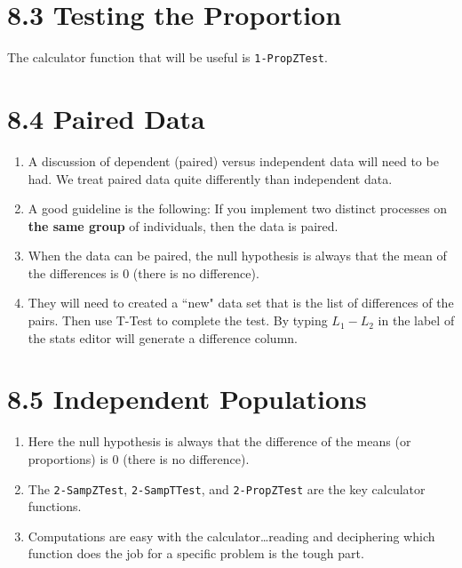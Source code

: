 \documentclass{article}
\begin{document}
\section*{8.3 Testing the Proportion}

The calculator function that will be useful is \texttt{1-PropZTest}.

\section*{8.4 Paired Data}

\begin{enumerate}

    \item A discussion of dependent (paired) versus independent data will need to be had.  We treat paired data quite differently than independent data.
    
    \item A good guideline is the following: If you implement two distinct processes on \textbf{the same group} of individuals, then the data is paired.
    
    \item When the data can be paired, the null hypothesis is always that the mean of the differences is 0 (there is no difference).
    
    \item They will need to created a ``new" data set that is the list of differences of the pairs. Then use T-Test to complete the test. By typing $L_1 - L_2$ in the label of the stats editor will generate a difference column.
    
\end{enumerate}

\section*{8.5 Independent Populations}

\begin{enumerate}

    \item Here the null hypothesis is always that the difference of the means (or proportions) is 0 (there is no difference).
    
    \item The \texttt{2-SampZTest}, \texttt{2-SampTTest}, and \texttt{2-PropZTest} are the key calculator functions.
    
    \item Computations are easy with the calculator\ldots reading and deciphering which function does the job for a specific problem is the tough part.
    
\end{enumerate}
\end{document}
